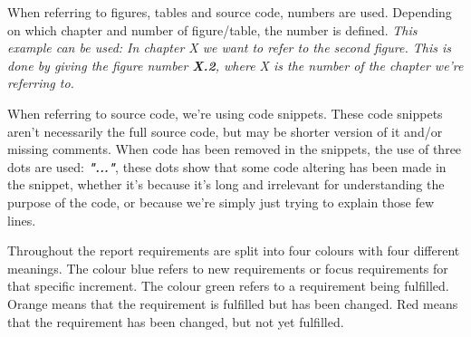 When referring to figures, tables and source code, numbers are used. Depending on which chapter and number of figure/table, the number is defined. \newline
\textit{This example can be used: In chapter X we want to refer to the second figure. This is done by giving the figure number \textbf{X.2}, where X is the number of the chapter we're referring to.}
\newline

When referring to source code, we're using code snippets. These code snippets aren't necessarily the full source code, but may be shorter version of it and/or missing comments. When code has been removed in the snippets, the use of three dots are used:  \textit\textbf{{"..."}}, these dots show that some code altering has been made in the snippet, whether it's because it's long and irrelevant for understanding the purpose of the code, or because we're simply just trying to explain those few lines. 

Throughout the report requirements are split into four colours with four different meanings. The colour blue refers to new requirements or focus requirements for that specific increment. The colour green refers to a requirement being fulfilled. Orange means that the requirement is fulfilled but has been changed. Red means that the requirement has been changed, but not yet fulfilled. 
